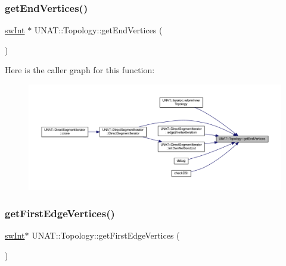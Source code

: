 \mbox{\label{classUNAT_1_1Topology_ac43549991442cb8fa3494b523c9ec1a5}} 
\subsubsection{\texorpdfstring{getEndVertices()}{getEndVertices()}\hspace{0.1cm}{\footnotesize\ttfamily [3/3]}}
{\footnotesize\ttfamily \mbox{\hyperlink{include_2swMacro_8h_a113cf5f6b5377cdf3fac6aa4e443e9aa}{sw\+Int}} $\ast$ U\+N\+A\+T\+::\+Topology\+::get\+End\+Vertices (\begin{DoxyParamCaption}{ }\end{DoxyParamCaption})}

Here is the caller graph for this function\+:
\nopagebreak
\begin{figure}[H]
\begin{center}
\leavevmode
\includegraphics[width=350pt]{classUNAT_1_1Topology_ac43549991442cb8fa3494b523c9ec1a5_icgraph}
\end{center}
\end{figure}
\mbox{\label{classUNAT_1_1Topology_a3df6e0098b30c960b01989b7e8044431}} 
\subsubsection{\texorpdfstring{getFirstEdgeVertices()}{getFirstEdgeVertices()}\hspace{0.1cm}{\footnotesize\ttfamily [1/3]}}
{\footnotesize\ttfamily \mbox{\hyperlink{include_2swMacro_8h_a113cf5f6b5377cdf3fac6aa4e443e9aa}{sw\+Int}}$\ast$ U\+N\+A\+T\+::\+Topology\+::get\+First\+Edge\+Vertices (\begin{DoxyParamCaption}{ }\end{DoxyParamCaption})}

